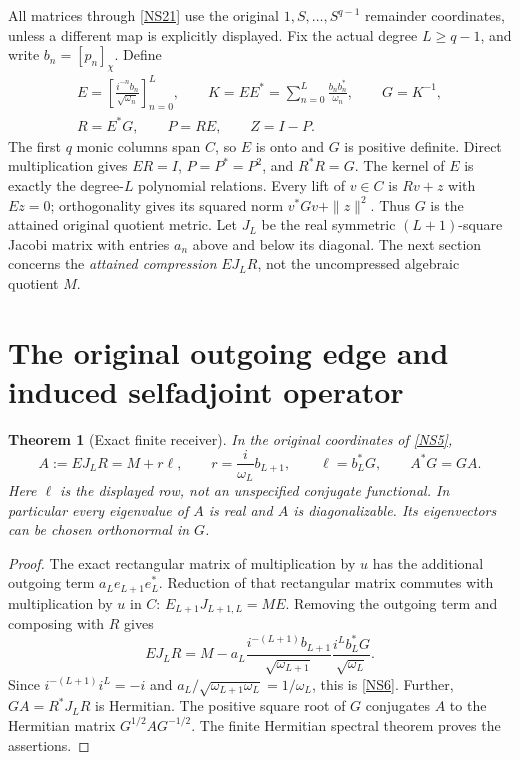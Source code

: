 \documentclass[11pt]{article}
\newtheorem{theorem}{Theorem}[section]
\begin{document}
All matrices through \eqref{NS21} use the original
$1,S,\ldots,S^{q-1}$ remainder coordinates, unless a different
map is explicitly displayed. Fix the actual degree $L\geq q-1$,
and write $b_n=[p_n]_\chi$. Define
\begin{equation}\tag{NS5}\label{NS5}
\begin{gathered}
E=\left[\frac{i^{-n}b_n}{\sqrt{\omega_n}}\right]_{n=0}^L,
\qquad K=EE^*=\sum_{n=0}^L\frac{b_nb_n^*}{\omega_n},
\qquad G=K^{-1},\\
R=E^*G,\qquad P=RE,\qquad Z=I-P.
\end{gathered}
\end{equation}
The first $q$ monic columns span $C$, so $E$ is onto and $G$
is positive definite. Direct multiplication gives $ER=I$,
$P=P^*=P^2$, and $R^*R=G$.
The kernel of $E$ is exactly the degree-$L$ polynomial
relations. Every lift of $v\in C$ is $Rv+z$ with $Ez=0$;
orthogonality gives its squared norm $v^*Gv+\|z\|^2$.
Thus $G$ is the attained original quotient metric.
Let $J_L$ be the real symmetric $(L+1)$-square Jacobi matrix
with entries $a_n$ above and below its diagonal. The next
section concerns the \emph{attained compression}
$EJ_LR$, not the uncompressed algebraic quotient $M$.

\section{The original outgoing edge and induced selfadjoint operator}

\begin{theorem}[Exact finite receiver]\label{thm:receiver}
In the original coordinates of \eqref{NS5},
\begin{equation}\tag{NS6}\label{NS6}
A:=EJ_LR=M+r\ell,\qquad
r=\frac{i}{\omega_L}b_{L+1},\qquad
\ell=b_L^*G,\qquad A^*G=GA .
\end{equation}
Here $\ell$ is the displayed row, not an unspecified
conjugate functional. In particular every eigenvalue of $A$
is real and $A$ is diagonalizable. Its eigenvectors can be
chosen orthonormal in $G$.
\end{theorem}
\begin{proof}
The exact rectangular matrix of multiplication by $u$ has
the additional outgoing term $a_Le_{L+1}e_L^*$.
Reduction of that rectangular matrix commutes with
multiplication by $u$ in $C$:
$E_{L+1}J_{L+1,L}=ME$. Removing the outgoing term and
composing with $R$ gives
\[
EJ_LR=M-a_L\frac{i^{-(L+1)}b_{L+1}}{\sqrt{\omega_{L+1}}}
              \frac{i^Lb_L^*G}{\sqrt{\omega_L}}.
\]
Since $i^{-(L+1)}i^L=-i$ and
$a_L/\sqrt{\omega_{L+1}\omega_L}=1/\omega_L$,
this is \eqref{NS6}. Further,
$GA=R^*J_LR$ is Hermitian. The positive square root of $G$
conjugates $A$ to the Hermitian matrix $G^{1/2}AG^{-1/2}$.
The finite Hermitian spectral theorem proves the assertions.
\end{proof}
\end{document}
